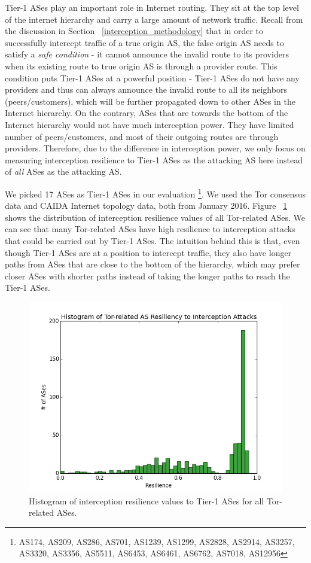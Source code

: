 Tier-1 ASes play an important role in Internet routing. They sit at the top level of the internet hierarchy and carry a large amount of network traffic. Recall from the discussion in Section ~\ref{interception_methodology} that in order to successfully intercept traffic of a true origin AS, the false origin AS needs to satisfy a \emph{safe condition} - it cannot announce the invalid route to its providers when its existing route to true origin AS is through a provider route. This condition puts Tier-1 ASes at a powerful position - Tier-1 ASes do not have any providers and thus can always announce the invalid route to all its neighbors (peers/customers), which will be further propagated down to other ASes in the Internet hierarchy. On the contrary, ASes that are towards the bottom of the Internet hierarchy would not have much interception power. They have limited number of peers/customers, and most of their outgoing routes are through providers. Therefore, due to the difference in interception power, we only focus on measuring interception resilience to Tier-1 ASes as the attacking AS here instead of \emph{all} ASes as the attacking AS. 

We picked 17 ASes as Tier-1 ASes in our evaluation \footnote{AS174, AS209, AS286, AS701, AS1239, AS1299, AS2828, AS2914, AS3257, AS3320, AS3356, AS5511, AS6453, AS6461, AS6762, AS7018, AS12956}. We used the Tor consensus data and CAIDA Internet topology data, both from January 2016. Figure ~\ref{fig:interception_histogram} shows the distribution of interception resilience values of all Tor-related ASes. We can see that many Tor-related ASes have high resilience to interception attacks that could be carried out by Tier-1 ASes. The intuition behind this is that, even though Tier-1 ASes are at a position to intercept traffic, they also have longer paths from ASes that are close to the bottom of the hierarchy, which may prefer closer ASes with shorter paths instead of taking the longer paths to reach the Tier-1 ASes. 

\begin{figure}[ht!]
\centering
\includegraphics[width=.4\textwidth]{interception_resiliency}
\caption{Histogram of interception resilience values to Tier-1 ASes for all Tor-related ASes.}
\label{fig:interception_histogram}
\end{figure}

